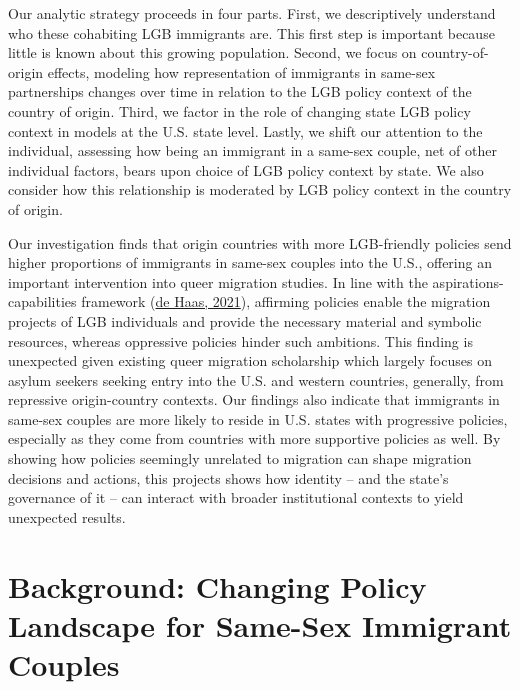 \documentclass[
  11pt,
]{article}
\begin{document}
Our analytic strategy proceeds in four parts. First, we descriptively understand who these cohabiting LGB immigrants are. This first step is important because little is known about this growing population. Second, we focus on country-of-origin effects, modeling how representation of immigrants in same-sex partnerships changes over time in relation to the LGB policy context of the country of origin. Third, we factor in the role of changing state LGB policy context in models at the U.S. state level. Lastly, we shift our attention to the individual, assessing how being an immigrant in a same-sex couple, net of other individual factors, bears upon choice of LGB policy context by state. We also consider how this relationship is moderated by LGB policy context in the country of origin.

Our investigation finds that origin countries with more LGB-friendly policies send higher proportions of immigrants in same-sex couples into the U.S., offering an important intervention into queer migration studies. In line with the aspirations-capabilities framework (\protect\hyperlink{ref-dehaas_2021}{de Haas, 2021}), affirming policies enable the migration projects of LGB individuals and provide the necessary material and symbolic resources, whereas oppressive policies hinder such ambitions. This finding is unexpected given existing queer migration scholarship which largely focuses on asylum seekers seeking entry into the U.S. and western countries, generally, from repressive origin-country contexts. Our findings also indicate that immigrants in same-sex couples are more likely to reside in U.S. states with progressive policies, especially as they come from countries with more supportive policies as well. By showing how policies seemingly unrelated to migration can shape migration decisions and actions, this projects shows how identity -- and the state's governance of it -- can interact with broader institutional contexts to yield unexpected results.

\hypertarget{background-changing-policy-landscape-for-same-sex-immigrant-couples}{%
\section{Background: Changing Policy Landscape for Same-Sex Immigrant Couples}\label{background-changing-policy-landscape-for-same-sex-immigrant-couples}}
\end{document}
